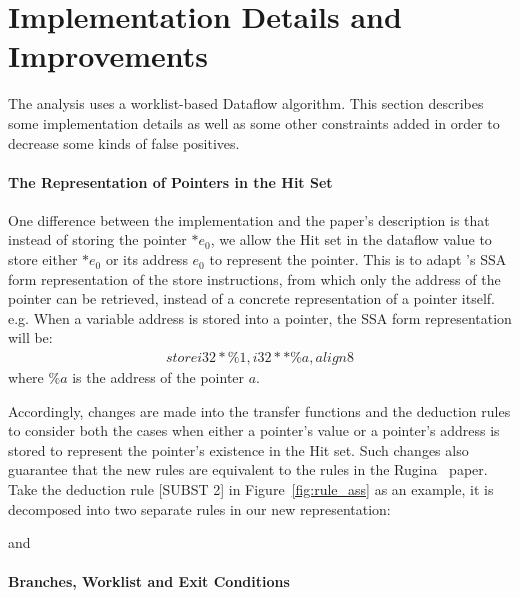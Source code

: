 \section{Implementation Details and Improvements}
\label{s:implementation}

The analysis uses a worklist-based Dataflow algorithm. 
This section describes some implementation details as well as some other 
constraints added in order to decrease some kinds of false positives.

\paragraph{The Representation of Pointers in the Hit Set}

One difference between the implementation and the paper's description is that 
instead of storing the pointer ${*e_0}$,
we allow the Hit set in the dataflow value to store either ${*e_0}$ or its 
address ${e_0}$ to represent the pointer. This is to adapt \llvm's SSA form 
representation of the store instructions, from which only the address of the 
pointer can be retrieved, instead of a concrete representation of a pointer itself. 
e.g. When a variable address is stored into a pointer, the SSA form 
representation will be:
\begin{align*}
store i32* \%1, i32** \%a, align 8
\end{align*}
where $\%a$ is the address of the pointer $a$.

Accordingly, changes are made into the transfer functions and the deduction 
rules to consider both the cases when either a pointer's value or a pointer's 
address is stored to represent the pointer's existence in the Hit set. 
Such changes also guarantee that the new rules are equivalent to the rules in 
the Rugina~\cite{rugina} paper. Take the deduction rule [SUBST 2] in 
Figure~\ref{fig:rule_ass} 
as an example, it is decomposed into two separate rules in our new representation:
\begin{prooftree}
\end{prooftree}
and
\begin{prooftree}
\end{prooftree}


\paragraph{Branches, Worklist and Exit Conditions}

